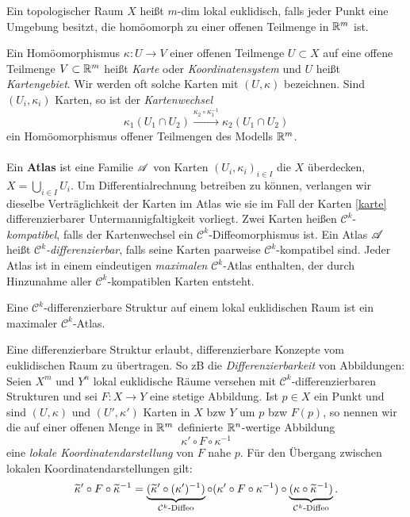 \begin{definition}
\begin{mdframed}
Ein topologischer Raum $X$ heißt $m$-dim lokal euklidisch, falls jeder Punkt eine Umgebung besitzt, die homöomorph zu einer offenen Teilmenge in $\R^m$ ist.
\end{mdframed}
\end{definition}
Ein Homöomorphismus $\kappa:U\to V$ einer offenen Teilmenge $U\subset X$ auf eine offene Teilmenge $V\subset \R^m$ heißt \emph{Karte} oder \emph{Koordinatensystem} und $U$ heißt \emph{Kartengebiet}. Wir werden oft solche Karten mit $(U,\kappa)$ bezeichnen. Sind $(U_i,\kappa_i)$ Karten, so ist der \emph{Kartenwechsel}
$$\kappa_1(U_1\cap U_2) \xrightarrow{\kappa_2\circ \kappa_1^{-1}} \kappa_2(U_1\cap U_2)$$
ein Homöomorphismus offener Teilmengen des Modells $\R^m$. \\\\
Ein \textbf{Atlas} ist eine Familie $\AA$ von Karten $(U_i,\kappa_i)_{i\in I}$ die $X$ überdecken, $X= \bigcup\limits_{i \in I}U_i$. Um Differentialrechnung betreiben zu können, verlangen wir dieselbe Verträglichkeit der Karten im Atlas wie sie im Fall der Karten \eqref{karte} differenzierbarer Untermannigfaltigkeit vorliegt. Zwei Karten heißen $\mathcal{C}^k$-\emph{kompatibel}, falls der Kartenwechsel ein $\mathcal{C}^k$-Diffeomorphismus ist. Ein Atlas $\AA$ heißt \emph{$\mathcal{C}^k$-differenzierbar}, falls seine Karten paarweise $\mathcal{C}^k$-kompatibel sind. Jeder Atlas ist in einem eindeutigen \emph{maximalen} $\mathcal{C}^k$-Atlas enthalten, der durch Hinzunahme aller $\mathcal{C}^k$-kompatiblen Karten entsteht.

\begin{definition}
\begin{mdframed}
Eine $\mathcal{C}^k$-differenzierbare Struktur auf einem lokal euklidischen Raum ist ein maximaler $\mathcal{C}^k$-Atlas.
\end{mdframed}
\end{definition}
Eine differenzierbare Struktur erlaubt, differenzierbare Konzepte vom euklidischen Raum zu übertragen. So zB die \emph{Differenzierbarkeit} von Abbildungen: Seien $X^m$ und $Y^n$ lokal euklidische Räume versehen mit $\mathcal{C}^k$-differenzierbaren Strukturen und sei $F:X\to Y$ eine stetige Abbildung. Ist $p \in X$ ein Punkt und sind $(U,\kappa)$ und $(U',\kappa')$ Karten in $X$ bzw $Y$ um $p$ bzw $F(p)$, so nennen wir die auf einer offenen Menge in $\R^m$ definierte $\R^n$-wertige Abbildung
$$\kappa' \circ F \circ \kappa^{-1}$$
eine \emph{lokale Koordinatendarstellung} von $F$ nahe $p$. Für den Übergang zwischen lokalen Koordinatendarstellungen gilt:
$$\widetilde{\kappa}' \circ F \circ \widetilde{\kappa}^{-1} = \underbrace{(\widetilde{\kappa}' \circ (\kappa')^{-1})}_{\mathcal{C}^k\te{-Diffeo}} \circ (\kappa' \circ F \circ \kappa^{-1}) \circ \underbrace{(\kappa \circ \widetilde{\kappa}^{-1})}_{\mathcal{C}^k\te{-Diffeo}}.$$

